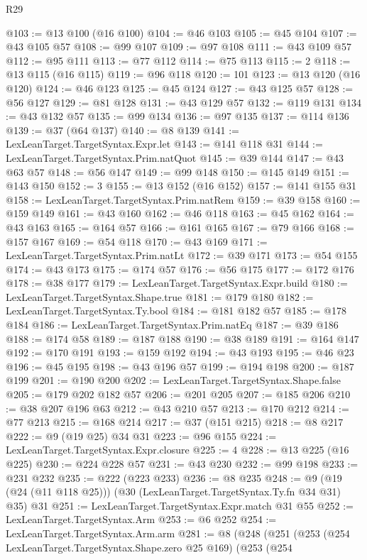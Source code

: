 \begin{lexlean}{R29}
\begin{coremodule}
@103 := @13 @100 (@16 @100)
@104 := @46 @103
@105 := @45 @104
@107 := @43 @105 @57
@108 := @99 @107
@109 := @97 @108
@111 := @43 @109 @57
@112 := @95 @111
@113 := @77 @112
@114 := @75 @113
@115 := 2
@118 := @13 @115 (@16 @115)
@119 := @96 @118
@120 := 101
@123 := @13 @120 (@16 @120)
@124 := @46 @123
@125 := @45 @124
@127 := @43 @125 @57
@128 := @56 @127
@129 := @81 @128
@131 := @43 @129 @57
@132 := @119 @131
@134 := @43 @132 @57
@135 := @99 @134
@136 := @97 @135
@137 := @114 @136
@139 := @37 (@64 @137)
@140 := @8 @139
@141 := LexLeanTarget.TargetSyntax.Expr.let
@143 := @141 @118 @31
@144 := LexLeanTarget.TargetSyntax.Prim.natQuot
@145 := @39 @144
@147 := @43 @63 @57
@148 := @56 @147
@149 := @99 @148
@150 := @145 @149
@151 := @143 @150
@152 := 3
@155 := @13 @152 (@16 @152)
@157 := @141 @155 @31
@158 := LexLeanTarget.TargetSyntax.Prim.natRem
@159 := @39 @158
@160 := @159 @149
@161 := @43 @160
@162 := @46 @118
@163 := @45 @162
@164 := @43 @163
@165 := @164 @57
@166 := @161 @165
@167 := @79 @166
@168 := @157 @167
@169 := @54 @118
@170 := @43 @169
@171 := LexLeanTarget.TargetSyntax.Prim.natLt
@172 := @39 @171
@173 := @54 @155
@174 := @43 @173
@175 := @174 @57
@176 := @56 @175
@177 := @172 @176
@178 := @38 @177
@179 := LexLeanTarget.TargetSyntax.Expr.build
@180 := LexLeanTarget.TargetSyntax.Shape.true
@181 := @179 @180
@182 := LexLeanTarget.TargetSyntax.Ty.bool
@184 := @181 @182 @57
@185 := @178 @184
@186 := LexLeanTarget.TargetSyntax.Prim.natEq
@187 := @39 @186
@188 := @174 @58
@189 := @187 @188
@190 := @38 @189
@191 := @164 @147
@192 := @170 @191
@193 := @159 @192
@194 := @43 @193
@195 := @46 @23
@196 := @45 @195
@198 := @43 @196 @57
@199 := @194 @198
@200 := @187 @199
@201 := @190 @200
@202 := LexLeanTarget.TargetSyntax.Shape.false
@205 := @179 @202 @182 @57
@206 := @201 @205
@207 := @185 @206
@210 := @38 @207 @196 @63
@212 := @43 @210 @57
@213 := @170 @212
@214 := @77 @213
@215 := @168 @214
@217 := @37 (@151 @215)
@218 := @8 @217
@222 := @9 (@19 @25) @34 @31
@223 := @96 @155
@224 := LexLeanTarget.TargetSyntax.Expr.closure
@225 := 4
@228 := @13 @225 (@16 @225)
@230 := @224 @228 @57
@231 := @43 @230
@232 := @99 @198
@233 := @231 @232
@235 := @222 (@223 @233)
@236 := @8 @235
@248 := @9 (@19 (@24 (@11 @118 @25))) (@30 (LexLeanTarget.TargetSyntax.Ty.fn @34 @31) @35) @31
@251 := LexLeanTarget.TargetSyntax.Expr.match @31 @55
@252 := LexLeanTarget.TargetSyntax.Arm
@253 := @6 @252
@254 := LexLeanTarget.TargetSyntax.Arm.arm
@281 := @8
    (@248
      (@251
        (@253
          (@254 LexLeanTarget.TargetSyntax.Shape.zero @25 @169)
          (@253
            (@254

\end{coremodule}
\end{lexlean}
